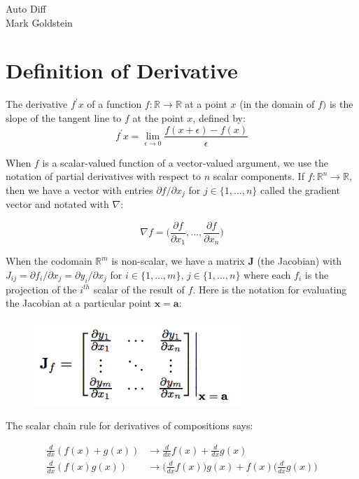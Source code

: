 \documentclass[11pt]{article}
\theoremstyle{definition}
\theoremstyle{plain}
\renewcommand{\v}[1]{\mathbf{#1}}
\renewcommand{\b}[1]{\mathbb{#1}}
\begin{document}
\begin{center}
Auto Diff\\ 
Mark Goldstein
\end{center}


\section{Definition of Derivative}

\noindent The derivative $f^\prime x$ of a function $f: \b{R} \rightarrow \b{R}$
at a point $x$ (in the domain of $f)$ is the slope of the tangent line to $f$
at the point $x$, defined by:
$$ f^\prime x = \lim_{\epsilon \rightarrow 0} \frac{f(x+\epsilon) - f(x)}{\epsilon} $$

\noindent When $f$ is a scalar-valued function of a vector-valued argument, 
we use the notation of partial derivatives with respect to $n$ scalar components. 
If $f: \b{R}^n \rightarrow \b{R}$, then we have a vector with entries 
$\partial f / \partial x_j$ for $j \in \{1,...,n\}$
called the gradient vector and notated with $\nabla$:

$$ \nabla f = \Big( \frac{\partial f}{\partial x_1},...,\frac{\partial f}{\partial x_n} \Big )$$

\noindent When the codomain $\b{R}^m$ is non-scalar, we have a matrix $\v{J}$ (the Jacobian)
with $J_{ij} = \partial f_i / \partial x_j = \partial y_i / \partial x_j$ for 
$i \in \{1,...,m\}$, $j \in \{1,...,n\}$  where each $f_i$ is the projection of the $i^{th}$ 
scalar of the result of $f$. Here is the notation for evaluating the Jacobian at a 
particular point $\v{x}=\v{a}$:

\begin{figure}[H]
\includegraphics[width=8cm]{jacobian}
\centering
\end{figure}

\noindent The scalar chain rule for derivatives of compositions says:

\begin{align*}
    \frac{d}{dx}(f(x)+g(x)) &\rightarrow \frac{d}{dx}f(x) + \frac{d}{dx}g(x)\\
    \frac{d}{dx}(f(x)g(x)) &\rightarrow \Big(\frac{d}{dx} f(x) \Big)g(x) +
                                        f(x)\Big(\frac{d}{dx}g(x) \Big)
\end{align*}
\end{document}
